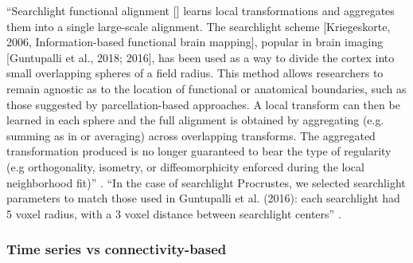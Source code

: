 


``Searchlight functional alignment [\citep{zhang2016searchlight,
guntupalli2016model}] learns local transformations and aggregates them into a
single large-scale alignment.
%
The searchlight scheme [Kriegeskorte, 2006, Information-based functional brain
mapping], popular in brain imaging [Guntupalli et al., 2018; 2016], has been
used as a way to divide the cortex into small overlapping spheres of a field
radius.
%
This method allows researchers to remain agnostic as to the location of
functional or anatomical boundaries, such as those suggested by
parcellation-based approaches.
%
A local transform can then be learned in each sphere and the full alignment is
obtained by aggregating (e.g. summing as in \citep{guntupalli2016model} or
averaging) across overlapping transforms.
%
The aggregated transformation produced is no longer guaranteed to bear the type
of regularity (e.g orthogonality, isometry, or diffeomorphicity enforced during
the local neighborhood fit)'' \citep{bazeille2021empirical}.
%
``In the case of searchlight Procrustes, we selected searchlight parameters to
match those used in Guntupalli et al. (2016):
%
each searchlight had 5 voxel radius, with a 3 voxel distance between searchlight
centers'' \citep{bazeille2021empirical}.


\subsubsection{Time series vs connectivity-based}






